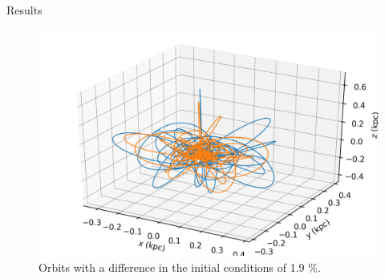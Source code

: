 \documentclass{beamer}
\begin{document}
\begin{frame}{Results}
	\begin{figure}[h]
		\centering
		\includegraphics[width = 0.7\linewidth]{"../Files/Week 14/lyapunov_orbits"}
		\caption{Orbits with a difference in the initial conditions of 1.9 \%.}
		\label{fig: lyapunov17}
	\end{figure}
\end{frame}
\end{document}

